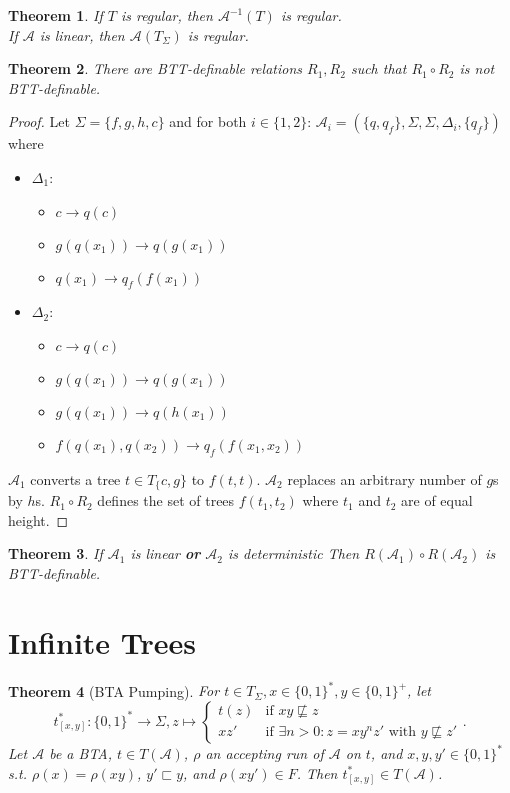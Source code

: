 \documentclass{article}
\newtheorem{theorem}{Theorem}[section]
\begin{document}
\begin{theorem}
	If $T$ is regular, then $\mathcal{A}^{-1}(T)$ is regular. \\
	If $\mathcal{A}$ is linear, then $\mathcal{A}(T_\Sigma)$ is regular.
\end{theorem}

\begin{theorem}
	There are BTT-definable relations $R_1, R_2$ such that $R_1 \circ R_2$ is not BTT-definable.
\end{theorem}
\begin{proof}
	Let $\Sigma = \{f,g,h,c\}$ and for both $i \in \{1,2\}$: $\mathcal{A}_i = (\{q,q_f\}, \Sigma, \Sigma, \Delta_i, \{q_f\})$ where 
	\begin{itemize}
		\item $\Delta_1$:
		\begin{itemize}
			\item $c \rightarrow q(c)$
			\item $g(q(x_1)) \rightarrow q(g(x_1))$
			\item $q(x_1) \rightarrow q_f(f(x_1))$
		\end{itemize}
		\item $\Delta_2$:
		\begin{itemize}
			\item $c \rightarrow q(c)$
			\item $g(q(x_1)) \rightarrow q(g(x_1))$
			\item $g(q(x_1)) \rightarrow q(h(x_1))$
			\item $f(q(x_1), q(x_2)) \rightarrow q_f(f(x_1, x_2))$
		\end{itemize}
	\end{itemize}
	
	$\mathcal{A}_1$ converts a tree $t \in T_\{c,g\}$ to $f(t, t)$.
	$\mathcal{A}_2$ replaces an arbitrary number of $g$s by $h$s.
	$R_1 \circ R_2$ defines the set of trees $f(t_1, t_2)$ where $t_1$ and $t_2$ are of equal height.
\end{proof}

\begin{theorem}
	If $\mathcal{A}_1$ is linear \textbf{or} $\mathcal{A}_2$ is deterministic Then $R(\mathcal{A}_1) \circ R(\mathcal{A}_2)$ is BTT-definable.
\end{theorem}


\section{Infinite Trees}
\begin{theorem}[BTA Pumping]
	For $t \in T_\Sigma, x \in \{0,1\}^*, y \in \{0,1\}^+$, let 
	$$t^*_{[x,y]} : \{0,1\}^* \rightarrow \Sigma, z \mapsto \begin{cases} t(z) & \text{if } xy \not\sqsubseteq z \\ xz' & \text{if } \exists n>0: z = xy^nz' \text{ with } y \not\sqsubseteq z' \end{cases}.$$
	Let $\mathcal{A}$ be a BTA, $t \in T(\mathcal{A})$, $\rho$ an accepting run of $\mathcal{A}$ on $t$, and $x, y, y' \in \{0,1\}^*$ s.t. $\rho(x) = \rho(xy)$, $y' \sqsubset y$, and $\rho(xy') \in F$. Then $t^*_{[x,y]} \in T(\mathcal{A})$.
\end{theorem}
\end{document}

